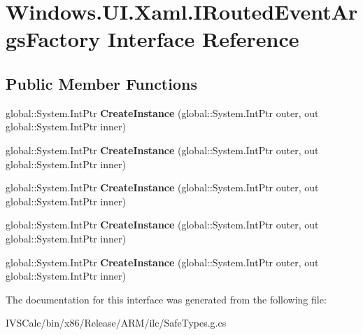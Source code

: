 \hypertarget{interface_windows_1_1_u_i_1_1_xaml_1_1_i_routed_event_args_factory}{}\section{Windows.\+U\+I.\+Xaml.\+I\+Routed\+Event\+Args\+Factory Interface Reference}
\label{interface_windows_1_1_u_i_1_1_xaml_1_1_i_routed_event_args_factory}
\subsection*{Public Member Functions}
\begin{DoxyCompactItemize}
\item 
\mbox{\label{interface_windows_1_1_u_i_1_1_xaml_1_1_i_routed_event_args_factory_a36a024163b18bc340b65c341c68f8fbc}} 
global\+::\+System.\+Int\+Ptr {\bfseries Create\+Instance} (global\+::\+System.\+Int\+Ptr outer, out global\+::\+System.\+Int\+Ptr inner)
\item 
\mbox{\label{interface_windows_1_1_u_i_1_1_xaml_1_1_i_routed_event_args_factory_a36a024163b18bc340b65c341c68f8fbc}} 
global\+::\+System.\+Int\+Ptr {\bfseries Create\+Instance} (global\+::\+System.\+Int\+Ptr outer, out global\+::\+System.\+Int\+Ptr inner)
\item 
\mbox{\label{interface_windows_1_1_u_i_1_1_xaml_1_1_i_routed_event_args_factory_a36a024163b18bc340b65c341c68f8fbc}} 
global\+::\+System.\+Int\+Ptr {\bfseries Create\+Instance} (global\+::\+System.\+Int\+Ptr outer, out global\+::\+System.\+Int\+Ptr inner)
\item 
\mbox{\label{interface_windows_1_1_u_i_1_1_xaml_1_1_i_routed_event_args_factory_a36a024163b18bc340b65c341c68f8fbc}} 
global\+::\+System.\+Int\+Ptr {\bfseries Create\+Instance} (global\+::\+System.\+Int\+Ptr outer, out global\+::\+System.\+Int\+Ptr inner)
\item 
\mbox{\label{interface_windows_1_1_u_i_1_1_xaml_1_1_i_routed_event_args_factory_a36a024163b18bc340b65c341c68f8fbc}} 
global\+::\+System.\+Int\+Ptr {\bfseries Create\+Instance} (global\+::\+System.\+Int\+Ptr outer, out global\+::\+System.\+Int\+Ptr inner)
\end{DoxyCompactItemize}


The documentation for this interface was generated from the following file\+:\begin{DoxyCompactItemize}
\item 
I\+V\+S\+Calc/bin/x86/\+Release/\+A\+R\+M/ilc/Safe\+Types.\+g.\+cs\end{DoxyCompactItemize}
